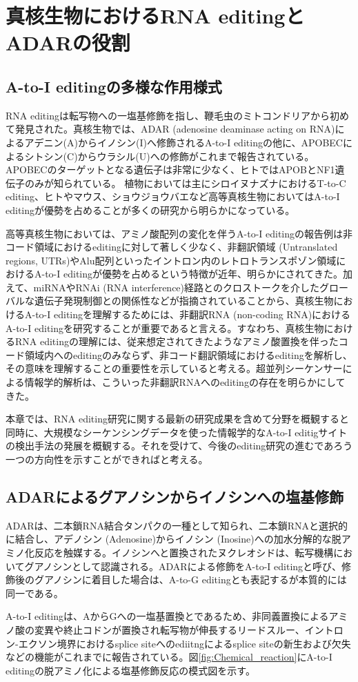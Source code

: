 \newpage

\section{真核生物におけるRNA editingとADARの役割}
\subsection{A-to-I editingの多様な作用様式}
RNA editingは転写物への一塩基修飾を指し、鞭毛虫のミトコンドリアから初めて発見された。真核生物では、ADAR (adenosine deaminase acting on RNA)によるアデニン(A)からイノシン(I)へ修飾されるA-to-I editingの他に、APOBECによるシトシン(C)からウラシル(U)への修飾がこれまで報告されている。APOBECのターゲットとなる遺伝子は非常に少なく、ヒトではAPOBとNF1遺伝子のみが知られている。
植物においては主にシロイヌナズナにおけるT-to-C editing、ヒトやマウス、ショウジョウバエなど高等真核生物においてはA-to-I editingが優勢を占めることが多くの研究から明らかになっている。
\par
高等真核生物においては、アミノ酸配列の変化を伴うA-to-I editingの報告例は非コード領域におけるeditingに対して著しく少なく、非翻訳領域 (Untranslated regions, UTRs)やAlu配列といったイントロン内のレトロトランスポゾン領域におけるA-to-I editingが優勢を占めるという特徴が近年、明らかにされてきた。加えて、miRNAやRNAi (RNA interference)経路とのクロストークを介したグローバルな遺伝子発現制御との関係性などが指摘されていることから、真核生物におけるA-to-I editingを理解するためには、非翻訳RNA (non-coding RNA)におけるA-to-I editingを研究することが重要であると言える。すなわち、真核生物におけるRNA editingの理解には、従来想定されてきたようなアミノ酸置換を伴ったコード領域内へのeditingのみならず、非コード翻訳領域におけるeditingを解析し、その意味を理解することの重要性を示していると考える。超並列シーケンサーによる情報学的解析は、こういった非翻訳RNAへのeditingの存在を明らかにしてきた。
\par
本章では、RNA editing研究に関する最新の研究成果を含めて分野を概観すると同時に、大規模なシーケンシングデータを使った情報学的なA-to-I editigサイトの検出手法の発展を概観する。それを受けて、今後のediting研究の進むであろう一つの方向性を示すことができればと考える。

\subsection{ADARによるグアノシンからイノシンへの塩基修飾}
ADARは、二本鎖RNA結合タンパクの一種として知られ、二本鎖RNAと選択的に結合し、アデノシン (Adenosine)からイノシン (Inosine)への加水分解的な脱アミノ化反応を触媒する。イノシンへと置換されたヌクレオシドは、転写機構においてグアノシンとして認識される。ADARによる修飾をA-to-I editingと呼び、修飾後のグアノシンに着目した場合は、A-to-G editingとも表記するが本質的には同一である。
\par
A-to-I editingは、AからGへの一塩基置換とであるため、非同義置換によるアミノ酸の変異や終止コドンが置換され転写物が伸長するリードスルー、イントロン-エクソン境界におけるsplice siteへのediitngによるsplice siteの新生および欠失などの機能がこれまでに報告されている。図\ref{fig:Chemical_reaction}にA-to-I editingの脱アミノ化による塩基修飾反応の模式図を示す。

